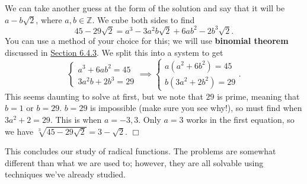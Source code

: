 \documentclass[../book.tex]{subfiles}
\begin{document}
\begin{solution}
We can take another guess at the form of the solution and say that it will be $a-b\sqrt{2}$, where $a,b\in\mathbb{Z}$.  We cube both sides to find $$45-29\sqrt{2}=a^3-3a^2b\sqrt{2}+6ab^2-2b^3\sqrt{2}.$$ You can use a method of your choice for this; we will use \textbf{binomial theorem} discussed in \hyperlink{section.6.4.3}{Section 6.4.3}. We split this into a system to get $$\begin{cases} a^3+6ab^2=45 \\ 3a^2b+2b^3=29 \end{cases} \implies \begin{cases} a(a^2+6b^2)=45 \\ b(3a^2+2b^2)=29\end{cases}.$$  This seems daunting to solve at first, but we note that $29$ is prime, meaning that $b=1$ or $b=29$.  $b=29$ is impossible (make sure you see why!), so must find when $3a^2+2=29$.  This is when $a=-3,3$.  Only $a=3$ works in the first equation, so we have $\sqrt[3]{45-29\sqrt{2}}=3-\sqrt{2}.$ $\Box$
\end{solution}
This concludes our study of radical functions.  The problems are somewhat different than what we are used to; however, they are all solvable using techniques we've already studied.
\end{document}
